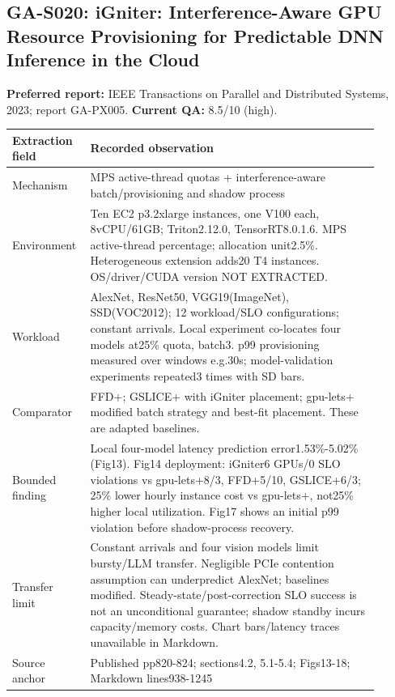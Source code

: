\subsection{GA-S020: iGniter: Interference-Aware GPU Resource Provisioning for Predictable DNN Inference in the Cloud}
\textbf{Preferred report:} IEEE Transactions on Parallel and Distributed Systems, 2023; report GA-PX005. \textbf{Current QA:} 8.5/10 (high).
\begin{longtable}{P{0.15\linewidth}P{0.75\linewidth}}
\toprule Extraction field & Recorded observation\\\midrule\endhead
Mechanism & MPS active-thread quotas + interference-aware batch/provisioning and shadow process\\
Environment & Ten EC2 p3.2xlarge instances, one V100 each, 8vCPU/61GB; Triton2.12.0, TensorRT8.0.1.6. MPS active-thread percentage; allocation unit2.5\%. Heterogeneous extension adds20 T4 instances. OS/driver/CUDA version NOT EXTRACTED.\\
Workload & AlexNet, ResNet50, VGG19(ImageNet), SSD(VOC2012); 12 workload/SLO configurations; constant arrivals. Local experiment co-locates four models at25\% quota, batch3. p99 provisioning measured over windows e.g.30s; model-validation experiments repeated3 times with SD bars.\\
Comparator & FFD+; GSLICE+ with iGniter placement; gpu-lets+ modified batch strategy and best-fit placement. These are adapted baselines.\\
Bounded finding & Local four-model latency prediction error1.53\%-5.02\%(Fig13). Fig14 deployment: iGniter6 GPUs/0 SLO violations vs gpu-lets+8/3, FFD+5/10, GSLICE+6/3; 25\% lower hourly instance cost vs gpu-lets+, not25\% higher local utilization. Fig17 shows an initial p99 violation before shadow-process recovery.\\
Transfer limit & Constant arrivals and four vision models limit bursty/LLM transfer. Negligible PCIe contention assumption can underpredict AlexNet; baselines modified. Steady-state/post-correction SLO success is not an unconditional guarantee; shadow standby incurs capacity/memory costs. Chart bars/latency traces unavailable in Markdown.\\
Source anchor & Published pp820-824; sections4.2, 5.1-5.4; Figs13-18; Markdown lines938-1245\\
\bottomrule\end{longtable}
